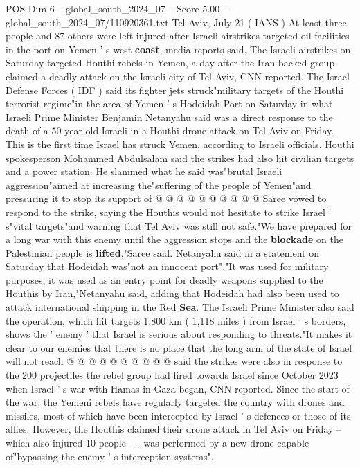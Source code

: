 \begin{textsample}{POS Dim 6 – global\_south\_2024\_07 – Score 5.00 – global\_south\_2024\_07/110920361.txt}  \label{ex:f6_pos_335}
Tel Aviv, July 21 ( IANS ) At least three people and 87 others were left injured after Israeli airstrikes targeted oil facilities in the port on Yemen ' s west \textbf{coast}, media reports said.
The Israeli airstrikes on Saturday targeted Houthi rebels in Yemen, a day after the Iran-backed group claimed a deadly attack on the Israeli city of Tel Aviv, CNN reported.
The Israel Defense Forces ( IDF ) said its fighter jets struck"military targets of the Houthi terrorist regime"in the area of Yemen ' s Hodeidah Port on Saturday in what Israeli Prime Minister Benjamin Netanyahu said was a direct response to the death of a 50-year-old Israeli in a Houthi drone attack on Tel Aviv on Friday.
This is the first time Israel has struck Yemen, according to Israeli officials.
Houthi spokesperson Mohammed Abdulsalam said the strikes had also hit civilian targets and a power station.
He slammed what he said was"brutal Israeli aggression"aimed at increasing the"suffering of the people of Yemen"and pressuring it to stop its support of @ @ @ @ @ @ @ @ @ @ Saree vowed to respond to the strike, saying the Houthis would not hesitate to strike Israel ' s"vital targets"and warning that Tel Aviv was still not safe."We have prepared for a long war with this enemy until the aggression stops and the \textbf{blockade} on the Palestinian people is \textbf{lifted},"Saree said.
Netanyahu said in a statement on Saturday that Hodeidah was"not an innocent port"."It was used for military purposes, it was used as an entry point for deadly weapons supplied to the Houthis by Iran,"Netanyahu said, adding that Hodeidah had also been used to attack international shipping in the Red \textbf{Sea}.
The Israeli Prime Minister also said the operation, which hit targets 1,800 km ( 1,118 miles ) from Israel ' s borders, shows the ' enemy ' that Israel is serious about responding to threats."It makes it clear to our enemies that there is no place that the long arm of the state of Israel will not reach @ @ @ @ @ @ @ @ @ @ said the strikes were also in response to the 200 projectiles the rebel group had fired towards Israel since October 2023 when Israel ' s war with Hamas in Gaza began, CNN reported.
Since the start of the war, the Yemeni rebels have regularly targeted the country with drones and missiles, most of which have been intercepted by Israel ' s defences or those of its allies.
However, the Houthis claimed their drone attack in Tel Aviv on Friday -- which also injured 10 people -- - was performed by a new drone capable of"bypassing the enemy ' s interception systems".

\end{textsample}
